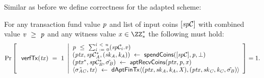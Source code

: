 Similar as before we define correctness for the adapted scheme:

\begin{definition}
    \label{def:atom:apt-tx-scheme-correctness}
    For any transaction fund value $\mathit{p}$ and list of input coins $[\mathit{sp}\mathcal{C}]$ with combined value $\mathit{v} ~\geq~ \mathit{p}$ and any witness value $\varX \opIn \cnstIntegersPrimeWithoutZero{*}$ the following must hold:
    \[
        \Pr\left[
        \begin{array}{c}
            \: \mathsf{verfTx}(\mathit{tx}) ~=~ 1
        \end{array}
        \middle\vert
        \begin{array}{l}
            \mathit{p} ~\leq~ \sum_{\mathit{i} ~:=~ 0}^{\mathit{i} ~<~ \mathit{n}}(\mathit{sp}\mathcal{C}_{i}.\mathit{v}) \\
            (\mathit{ptx}, \mathit{sp}\mathcal{C}_{\mathit{A}}^*, (\mathit{sk}_{\mathit{A}}, \mathit{\mathit{k}_{\mathit{A}}})) ~\leftarrow~ \mathsf{spendCoins}([\mathit{sp}\mathcal{C}],\mathit{p},\bot) \\
            (\mathit{ptx}^*, \mathit{sp}\mathcal{C}_{\mathit{B}}^*, \tilde{\sigma_{\mathit{B}}}) ~\leftarrow~ \mathsf{aptRecvCoins}(\mathit{ptx},\mathit{p},\mathit{x}) \\
            \langle \tilde{\sigma_{\mathit{A}\mathit{C}}}, \mathit{tx} \rangle ~\leftarrow~ \mathsf{dAptFinTx} \langle (\mathit{ptx},\mathit{sk}_{\mathit{A}},\mathit{\mathit{k}_{\mathit{A}}},\mathit{X}), (\mathit{ptx},\mathit{sk}_{\mathit{C}},\mathit{\mathit{k}_{\mathit{C}}},\tilde{\sigma_{\mathit{B}}}) \rangle
        \end{array}
        \right]=1.
    \]
\end{definition}